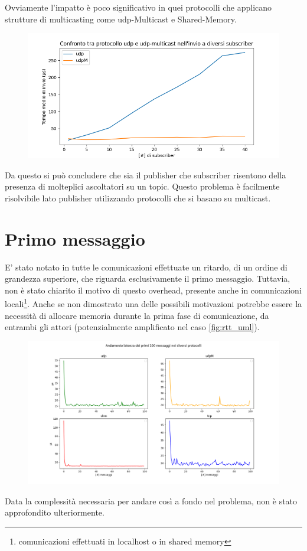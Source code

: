 Ovviamente l'impatto è poco significativo in quei protocolli che applicano strutture di \gls{multicasting} come udp-Multicast e Shared-Memory. 

\begin{figure}[H]
    \includegraphics[width=\textwidth]{./results/test3_udpvsudpM.png} 
        \caption{} %
        \label{}
\end{figure}

Da questo si può concludere che sia il publisher che subscriber risentono della presenza di molteplici ascoltatori su un topic. Questo problema è facilmente risolvibile lato publisher utilizzando protocolli che si basano su multicast. 


\section{Primo messaggio}
E' stato notato in tutte le comunicazioni effettuate un ritardo, di un ordine di grandezza superiore, che riguarda esclusivamente il primo messaggio. Tuttavia, non è stato chiarito il motivo di questo \gls{overhead}, presente anche in comunicazioni locali\footnote{comunicazioni effettuati in localhost o in shared memory}. Anche se non dimostrato una delle possibili motivazioni potrebbe essere la necessità di allocare memoria durante la prima fase di comunicazione, da entrambi gli attori (potenzialmente amplificato nel caso \ref{fig:rtt_uml}). 
\begin{figure}[H]
    \includegraphics[width=\textwidth]{./results/errortest.png} 
    \caption{} %
    \label{}
\end{figure}
Data la complessità necessaria per andare così a fondo nel problema, non è stato approfondito ulteriormente.

